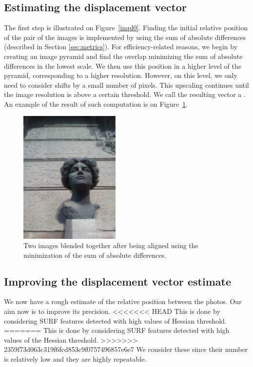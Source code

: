 \subsection{Estimating the displacement vector}
The first step is illustrated on Figure~\ref{impl0}.
Finding the initial relative position of the pair of the images is implemented by using the sum of absolute differences (described in Section \ref{sec:metrics}).
For efficiency-related reasons, we begin by creating an image pyramid and find the overlap minimizing the sum of absolute differences in the lowest scale. 
We then use this position in a higher level of the pyramid, corresponding to a higher resolution. 
However, on this level, we only need to consider shifts by a small number of pixels. 
This upscaling continues until the image resolution is above a certain threshold. 
We call the resulting vector a .
An example of the result of such computation is on Figure~\ref{emaover}.

\begin{figure}[H]
\centering
\includegraphics[width=5cm]{img/ema_overlap.png}
\caption{Two images blended together after being aligned using the minimization of the sum of absolute differences.}
\label{emaover}
\end{figure} 

\subsection{Improving the displacement vector estimate}
\label{sec:improving}

We now have a rough estimate of the relative position between the photos. 
Our aim now is to improve its precision.
<<<<<<< HEAD
This is done by considering SURF features detected with high values of Hessian threshold. 
=======
This is done by considering SURF features detected with high values of the Hessian threshold. 
>>>>>>> 2359f73d063c319f6fcd853c9f0757496857e6e7
We consider these since their number is relatively low and they are highly repeatable. 

